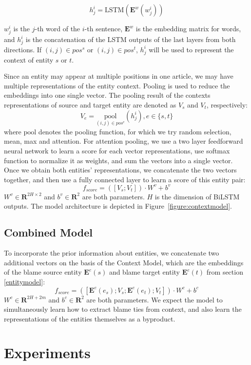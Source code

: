 \documentclass[11pt,a4paper]{article}
\begin{document}
$$h^i_j=\mathrm{LSTM}(\mathbf{E}^w(w^i_j))$$

$w^i_j$ is the $j$-th word of the $i$-th sentence, $\mathbf{E}^w$ is the embedding matrix for words, and $h^i_j$ is the concatenation of the LSTM outputs of the last layers from both directions. If $(i, j) \in pos^s$ or $(i, j) \in pos^t$, $h^i_j$ will be used to represent the context of entity $s$ or $t$.

Since an entity may appear at multiple positions in one article, we may have multiple representations of the entity context. Pooling is used to reduce the embeddings into one single vector. The pooling result of the contexts representations of source and target entity are denoted as $V_s$ and $V_t$, respectively: $$V_e = \underset{(i, j) \in pos^e} {\mathrm{pool}} (h^i_j), e \in \{s, t\}$$where $\mathrm{pool}$ denotes the pooling function, for which we try random selection, mean, max and attention. For attention pooling, we use a two layer feedforward neural network to learn a score for each vector representations, use softmax function to normalize it as weights, and sum the vectors into a single vector. Once we obtain both entities' representations, we concatenate the two vectors together, and then use a fully connected layer to learn a score of this entity pair: $$f_{score} = ([V_s; V_t]) \cdot W^v + b^v $$ $W^v \in \mathbf{R}^{2H \times 2}$ and $b^v \in \mathbf{R}^{2}$ are both parameters. $H$ is the dimension of BiLSTM outputs. The model architecture is depicted in Figure~\ref{figure:contextmodel}.

\subsection{Combined Model}

To incorporate the prior information about entities, we concatenate two additional vectors on the basis of the Context Model, which are the embeddings of the blame source entity $\mathbf{E}^e(s)$ and blame target entity $\mathbf{E}^e(t)$ from section \ref{entitymodel}: $$f_{score} = ([\mathbf{E}^e(e_s); V_s; \mathbf{E}^e(e_t); V_t]) \cdot W^c + b^c $$ $W^c \in \mathbf{R}^{2H + 2m}$ and $b^c \in \mathbf{R}^{2}$ are both parameters. We expect the model to simultaneously learn how to extract blame ties from context, and also learn the representations of the entities themselves as a byproduct.

\section{Experiments}
\label{experiment}
\end{document}
